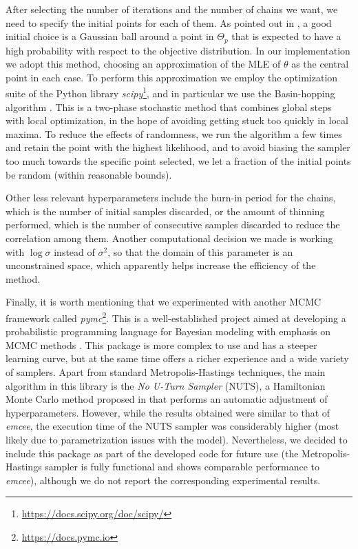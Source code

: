 After selecting the number of iterations and the number of chains we want, we need to specify the initial points for each of them. As pointed out in \citet{foreman2013emcee}, a good initial choice is a Gaussian ball around a point in \(\Theta_p\) that is expected to have a high probability with respect to the objective distribution. In our implementation we adopt this method, choosing an approximation of the MLE of \(\theta\) as the central point in each case. To perform this approximation we employ the optimization suite of the Python library \textit{scipy}\footnote{\url{https://docs.scipy.org/doc/scipy/}}, and in particular we use the Basin-hopping algorithm \citep{wales1997global}. This is a two-phase stochastic method that combines global steps with local optimization, in the hope of avoiding getting stuck too quickly in local maxima. To reduce the effects of randomness, we run the algorithm a few times and retain the point with the highest likelihood, and to avoid biasing the sampler too much towards the specific point selected, we let a fraction of the initial points be random (within reasonable bounds).

Other less relevant hyperparameters include the burn-in period for the chains, which is the number of initial samples discarded, or the amount of thinning performed, which is the number of consecutive samples discarded to reduce the correlation among them. Another computational decision we made is working with \(\log \sigma\) instead of \(\sigma^2\), so that the domain of this parameter is an unconstrained space, which apparently helps increase the efficiency of the method.

Finally, it is worth mentioning that we experimented with another MCMC framework called \textit{pymc}\footnote{\url{https://docs.pymc.io}}. This is a well-established project aimed at developing a probabilistic programming language for Bayesian modeling with emphasis on MCMC methods \citep{salvatier2016probabilistic}. This package is more complex to use and has a steeper learning curve, but at the same time offers a richer experience and a wide variety of samplers. Apart from standard Metropolis-Hastings techniques, the main algorithm in this library is the \textit{No U-Turn Sampler} (NUTS), a Hamiltonian Monte Carlo method proposed in \citet{hoffman2014no} that performs an automatic adjustment of hyperparameters. However, while the results obtained were similar to that of \textit{emcee}, the execution time of the NUTS sampler was considerably higher (most likely due to parametrization issues with the model). Nevertheless, we decided to include this package as part of the developed code for future use (the Metropolis-Hastings sampler is fully functional and shows comparable performance to \textit{emcee}), although we do not report the corresponding experimental results.


